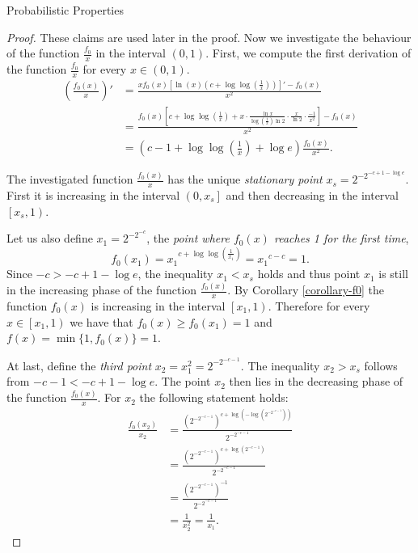 \begin{section}{Probabilistic Properties}
\begin{proof}
These claims are used later in the proof. Now we investigate the behaviour of the function $\frac{f_0}{x}$ in the interval $(0, 1)$. First, we compute the first derivation of the function $\frac{f_0}{x}$ for every $x \in (0, 1)$.
\[
\begin{split}
\left(\frac{f_0(x)}{x}\right)' 
	& = \frac{xf_0(x)\left[\ln(x)\left(c + \log \log \left(\frac{1}{x}\right)\right)\right]' - f_0(x)}{x^2} \\
	& = \frac{f_0(x)\left[c + \log \log \left(\frac{1}{x}\right) + x \cdot \frac{\ln x}{\log\left(\frac{1}{x}\right) \ln 2}\cdot\frac{x}{\ln 2}\cdot\frac{-1}{x ^ 2} \right] - f_0(x)}{x^2} \\
	& = \left(c - 1 + \log \log \left( \frac{1}{x} \right) + \log e \right)\frac{f_0(x)}{x^2} \text{.}
\end{split}
\]

The investigated function $\frac{f_0(x)}{x}$ has the unique \emph{stationary point} $x_s = 2 ^ {-2 ^ {-c + 1 - \log e}}$. First it is increasing in the interval $\left(0, x_s \right]$ and then decreasing in the interval $\left[x_s, 1\right)$. 

Let us also define $x_1 = 2 ^ {-2 ^ {-c}}$, the \emph{point where $f_0(x)$ reaches 1 for the first time},
\[
f_0(x_1) = {x_1} ^ {c + \log \log \left(\frac{1}{x_1}\right)} = {x_1} ^ {c - c} = 1 \text{.}
\]
Since $-c > -c + 1 -\log e$, the inequality $x_1 < x_s$ holds and thus point $x_1$ is still in the increasing phase of the function $\frac{f_0(x)}{x}$.
By Corollary \ref{corollary-f0} the function $f_0(x)$ is increasing in the interval $\left[x_1, 1\right)$. Therefore for every $x \in \left[x_1, 1\right)$ we have that $f_0(x) \geq f_0(x_1) = 1$ and $f(x) = \min \{1, f_0(x)\} = 1$.

At last, define the \emph{third point} $x_2 = x_1 ^ 2 = 2 ^ {-2 ^ {-c - 1}}$. The inequality $x_2 > x_s$ follows from $-c - 1 < -c + 1 - \log e$. The point $x_2$ then lies in the decreasing phase of the function $\frac{f_0(x)}{x}$. For $x_2$ the following statement holds:
\[
\begin{split}
\frac{f_0(x_2)}{x_2} 
	& = \frac{\left(2 ^ {-2 ^ {-c - 1}}\right) ^ {c + \log \left(- \log \left(2 ^ {-2 ^ {-c - 1}}\right)\right)}}{2 ^ {-2 ^ {-c - 1}}} \\
	& = \frac{\left(2 ^ {-2 ^ {-c - 1}}\right) ^ {c + \log \left(2 ^ {-c - 1}\right)}}{2 ^ {-2 ^ {-c - 1}}} \\
	& = \frac{\left(2 ^ {-2 ^ {-c - 1}}\right) ^ {-1}}{2 ^ {-2 ^ {-c - 1}}} \\
	& = \frac{1}{x_2^2} = \frac{1}{x_1} \text{.}
\end{split}
\]


\end{proof}
\end{section}
